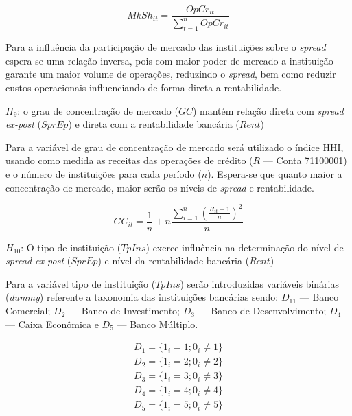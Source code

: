 \documentclass[
  12pt,
  12pt,
  openright,
  oneside,
  a4paper,
  chapter=TITLE,
  section=TITLE,
  subsection=TITLE,
  subsubsection=TITLE,
  english,
  portugues,
  sumario=tradicional]{abntex2}
\begin{document}
\begin{equation}
MkSh_{it} = \frac{OpCr_{it}}{\sum_{t=1}^nOpCr_{it}}
\end{equation}

Para a influência da participação de mercado das instituições sobre o \emph{spread} espera-se uma relação inversa, pois com maior poder de mercado a instituição garante um maior volume de operações, reduzindo o \emph{spread}, bem como reduzir custos operacionais influenciando de forma direta a rentabilidade.

\(H_{9}\): o grau de concentração de mercado (\(GC\)) mantém relação direta com \emph{spread ex-post} (\(SprEp\)) e direta com a rentabilidade bancária (\(Rent\))

Para a variável de grau de concentração de mercado será utilizado o índice HHI, usando como medida as receitas das operações de crédito (\(R\) --- Conta 71100001) e o número de instituições para cada período (\(n\)). Espera-se que quanto maior a concentração de mercado, maior serão os níveis de \emph{spread} e rentabilidade.

\begin{equation}
GC_{it} = \frac{1}{n} + n\frac{\sum_{i=1}^{n}(\frac{R_{it} - 1}{n})^2}{n}
\end{equation}

\vspace{20pt}

\(H_{10}\): O tipo de instituição (\(TpIns\)) exerce influência na determinação do nível de \emph{spread ex-post} (\(SprEp\)) e nível da rentabilidade bancária (\(Rent\))

Para a variável tipo de instituição (\(TpIns\)) serão introduzidas variáveis binárias (\emph{dummy}) referente a taxonomia das instituições bancárias sendo: \(D_{11}\) --- Banco Comercial; \(D_{2}\) --- Banco de Investimento; \(D_{3}\) --- Banco de Desenvolvimento; \(D_{4}\) --- Caixa Econômica e \(D_{5}\) --- Banco Múltiplo.

\begin{equation}
\begin{aligned}
D_{1} = \lbrace 1_{i} = 1 ; 0_{i} \neq 1 \rbrace \\
D_{2} = \lbrace 1_{i} = 2 ; 0_{i} \neq 2 \rbrace \\
D_{3} = \lbrace 1_{i} = 3 ; 0_{i} \neq 3 \rbrace \\
D_{4} = \lbrace 1_{i} = 4 ; 0_{i} \neq 4 \rbrace \\
D_{5} = \lbrace 1_{i} = 5 ; 0_{i} \neq 5 \rbrace
\end{aligned}
\end{equation}
\end{document}
